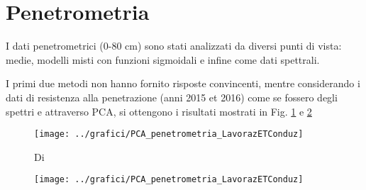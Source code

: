 \documentclass[a4paper]{article}
\begin{document}
\section{Penetrometria}

I dati penetrometrici (0-80 cm) sono stati analizzati da diversi punti
di vista: medie, modelli misti con funzioni sigmoidali e infine come dati spettrali.

I primi due metodi non hanno fornito risposte convincenti, mentre
considerando i dati di resistenza alla penetrazione (anni 2015 et
2016) come se fossero degli spettri e attraverso PCA, si ottengono i
risultati mostrati in Fig. \ref{fig:PenetrometriaLav} e
\ref{fig:PenetrometriaCond}


\begin{figure}[ht]
  \centering
\texttt{[image: ../grafici/PCA\_penetrometria\_LavorazETConduz]}
\caption{Di}
  \label{fig:PenetrometriaLav}
\end{figure}

\begin{figure}[ht]
  \centering
\texttt{[image: ../grafici/PCA\_penetrometria\_LavorazETConduz]}
\caption{}
  \label{fig:PenetrometriaCond}
\end{figure}



\end{document}
